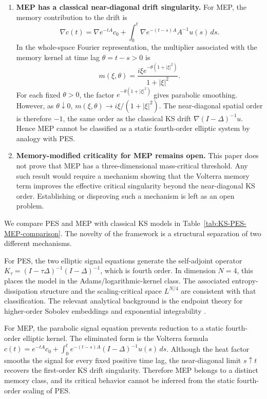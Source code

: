 \documentclass[pdflatex,sn-mathphys-num]{sn-jnl}%
\theoremstyle{thmstyleone}
\theoremstyle{thmstyletwo}
\theoremstyle{thmstylethree}
\begin{document}
\begin{enumerate}[label=\textbf{Theorem \Alph*.}]
\item \textbf{MEP has a classical near-diagonal drift singularity.}
For MEP, the memory contribution to the drift is
\[
        \nabla c(t)=\nabla e^{-tA}c_0+\int_0^t\nabla e^{-(t-s)A}A^{-1}u(s)\,ds .
\]
In the whole-space Fourier representation, the multiplier associated with the memory kernel at time lag \(\theta=t-s>0\) is
\begin{equation}
\label{eq:MEP-multiplier-intro}
        m(\xi,\theta)=\frac{i\xi e^{-\theta(1+|\xi|^2)}}{1+|\xi|^2}.
\end{equation}
For each fixed \(\theta>0\), the factor \(e^{-\theta(1+|\xi|^2)}\) gives parabolic smoothing.  However, as \(\theta\downarrow0\), \(m(\xi,\theta)\to i\xi/(1+|\xi|^2)\).  The near-diagonal spatial order is therefore \(-1\), the same order as the classical KS drift \(\nabla(I-\Delta)^{-1}u\).  Hence MEP cannot be classified as a static fourth-order elliptic system by analogy with PES.

\item \textbf{Memory-modified criticality for MEP remains open.}
This paper does not prove that MEP has a three-dimensional mass-critical threshold.  Any such result would require a mechanism showing that the Volterra memory term improves the effective critical singularity beyond the near-diagonal KS order.  Establishing or disproving such a mechanism is left as an open problem.
\end{enumerate}

We compare PES and MEP with classical KS models in Table~\ref{tab:KS-PES-MEP-comparison}.
The novelty of the framework is a structural separation of two different mechanisms.

For PES, the two elliptic signal equations generate the self-adjoint operator \(K_\tau=(I-\tau\Delta)^{-1}(I-\Delta)^{-1}\), which is fourth order.  In dimension \(N=4\), this places the model in the Adams/logarithmic-kernel class.  The associated entropy-dissipation structure and the scaling-critical space \(L^{N/4}\) are consistent with that classification.  The relevant analytical background is the endpoint theory for higher-order Sobolev embeddings and exponential integrability \cite{adams1988sharp,adams2003sobolev,lin1998classification,martinazzi2009classification}.

For MEP, the parabolic signal equation prevents reduction to a static fourth-order elliptic kernel.  The eliminated form is the Volterra formula \(c(t)=e^{-tA}c_0+\int_0^t e^{-(t-s)A}(I-\Delta)^{-1}u(s)\,ds\). Although the heat factor smooths the signal for every fixed positive time lag, the near-diagonal limit \(s\uparrow t\) recovers the first-order KS drift singularity.  Therefore MEP belongs to a distinct memory class, and its critical behavior cannot be inferred from the static fourth-order scaling of PES.
\end{document}
